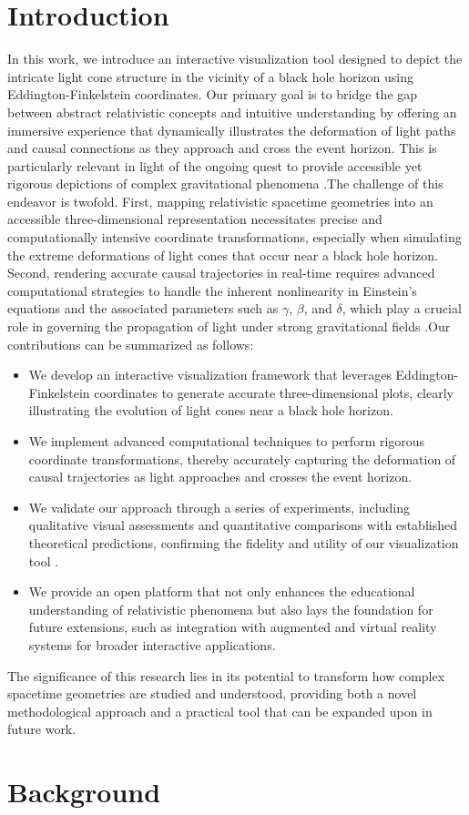 \documentclass{article}
\begin{document}
\section{Introduction}In this work, we introduce an interactive visualization tool designed to depict the intricate light cone structure in the vicinity of a black hole horizon using Eddington-Finkelstein coordinates. Our primary goal is to bridge the gap between abstract relativistic concepts and intuitive understanding by offering an immersive experience that dynamically illustrates the deformation of light paths and causal connections as they approach and cross the event horizon. This is particularly relevant in light of the ongoing quest to provide accessible yet rigorous depictions of complex gravitational phenomena \cite{Reference1 Reference2}.The challenge of this endeavor is twofold. First, mapping relativistic spacetime geometries into an accessible three-dimensional representation necessitates precise and computationally intensive coordinate transformations, especially when simulating the extreme deformations of light cones that occur near a black hole horizon. Second, rendering accurate causal trajectories in real-time requires advanced computational strategies to handle the inherent nonlinearity in Einstein's equations and the associated parameters such as $\gamma$, $\beta$, and $\delta$, which play a crucial role in governing the propagation of light under strong gravitational fields \cite{Reference3}.Our contributions can be summarized as follows:\begin{itemize}  \item We develop an interactive visualization framework that leverages Eddington-Finkelstein coordinates to generate accurate three-dimensional plots, clearly illustrating the evolution of light cones near a black hole horizon.  \item We implement advanced computational techniques to perform rigorous coordinate transformations, thereby accurately capturing the deformation of causal trajectories as light approaches and crosses the event horizon.  \item We validate our approach through a series of experiments, including qualitative visual assessments and quantitative comparisons with established theoretical predictions, confirming the fidelity and utility of our visualization tool \cite{Reference4}.  \item We provide an open platform that not only enhances the educational understanding of relativistic phenomena but also lays the foundation for future extensions, such as integration with augmented and virtual reality systems for broader interactive applications.\end{itemize}The significance of this research lies in its potential to transform how complex spacetime geometries are studied and understood, providing both a novel methodological approach and a practical tool that can be expanded upon in future work.\section{Background}
\end{document}

